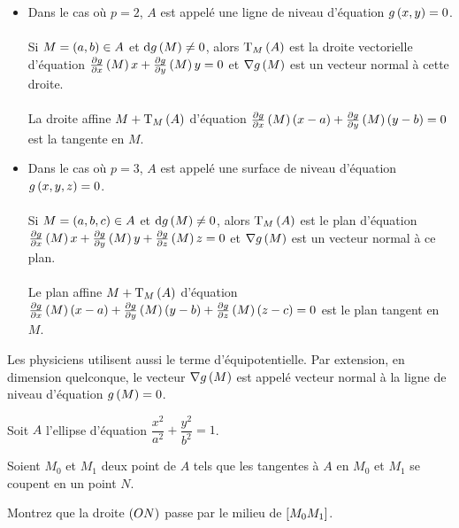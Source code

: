 \begin{rem}
\begin{itemize}
    \item Dans le cas où \(p=2\), \(A\) est appelé une ligne de niveau d'équation \(g\left(x,y\right)=0\). \\\\ Si \(M=\left(a,b\right)\in A\) et \(\odif{g}\paren{M}\not=0\), alors \(\operatorname{T}_{M}\left(A\right)\) est la droite vectorielle d'équation \(\pdv{g}{x}\left(M\right)x+\pdv{g}{y}\left(M\right)y=0\) et \(\nabla g\left(M\right)\) est un vecteur normal à cette droite. \\\\ La droite affine \(M+\operatorname{T}_{M}\left(A\right)\) d'équation \(\pdv{g}{x}\left(M\right)\left(x-a\right)+\pdv{g}{y}\left(M\right)\left(y-b\right)=0\) est la tangente en \(M\). \\
    \item Dans le cas où \(p=3\), \(A\) est appelé une surface de niveau d'équation \(g\left(x,y,z\right)=0\). \\\\ Si \(M=\left(a,b,c\right)\in A\) et \(\odif{g}\paren{M}\not=0\), alors \(\operatorname{T}_{M}\left(A\right)\) est le plan d'équation \(\pdv{g}{x}\left(M\right)x+\pdv{g}{y}\left(M\right)y+\pdv{g}{z}\left(M\right)z=0\) et \(\nabla g\left(M\right)\) est un vecteur normal à ce plan. \\\\ Le plan affine \(M+\operatorname{T}_{M}\left(A\right)\) d'équation \(\pdv{g}{x}\left(M\right)\left(x-a\right)+\pdv{g}{y}\left(M\right)\left(y-b\right)+\pdv{g}{z}\left(M\right)\left(z-c\right)=0\) est le plan tangent en \(M\).
\end{itemize}

Les physiciens utilisent aussi le terme d'équipotentielle. Par extension, en dimension quelconque, le vecteur \(\nabla g\left(M\right)\) est appelé vecteur normal à la ligne de niveau d'équation \(g\left(M\right)=0\).
\end{rem}

\begin{exo}
Soit \(A\) l'ellipse d'équation \(\dfrac{x^2}{a^2}+\dfrac{y^2}{b^2}=1\).

Soient \(M_0\) et \(M_1\) deux point de \(A\) tels que les tangentes à \(A\) en \(M_0\) et \(M_1\) se coupent en un point \(N\).

Montrez que la droite \(\left(ON\right)\) passe par le milieu de \(\left[M_0M_1\right]\).
\end{exo}

